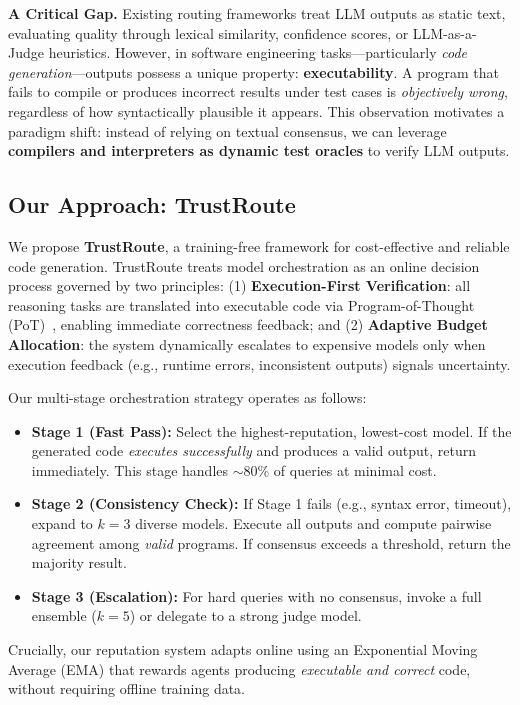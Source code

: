 \documentclass[acmsmall,screen,review,anonymous]{acmart}
\begin{document}
\textbf{A Critical Gap.} Existing routing frameworks treat LLM outputs as static text, evaluating quality through lexical similarity, confidence scores, or LLM-as-a-Judge heuristics. However, in software engineering tasks—particularly \textit{code generation}—outputs possess a unique property: \textbf{executability}. A program that fails to compile or produces incorrect results under test cases is \textit{objectively wrong}, regardless of how syntactically plausible it appears. This observation motivates a paradigm shift: instead of relying on textual consensus, we can leverage \textbf{compilers and interpreters as dynamic test oracles} to verify LLM outputs.

\subsection{Our Approach: TrustRoute}
We propose \textbf{TrustRoute}, a training-free framework for cost-effective and reliable code generation. TrustRoute treats model orchestration as an online decision process governed by two principles: (1) \textbf{Execution-First Verification}: all reasoning tasks are translated into executable code via Program-of-Thought (PoT)~\cite{gao2022pal}, enabling immediate correctness feedback; and (2) \textbf{Adaptive Budget Allocation}: the system dynamically escalates to expensive models only when execution feedback (e.g., runtime errors, inconsistent outputs) signals uncertainty.

Our multi-stage orchestration strategy operates as follows:
\begin{itemize}
    \item \textbf{Stage 1 (Fast Pass):} Select the highest-reputation, lowest-cost model. If the generated code \textit{executes successfully} and produces a valid output, return immediately. This stage handles $\sim$80\% of queries at minimal cost.
    \item \textbf{Stage 2 (Consistency Check):} If Stage 1 fails (e.g., syntax error, timeout), expand to $k=3$ diverse models. Execute all outputs and compute pairwise agreement among \textit{valid} programs. If consensus exceeds a threshold, return the majority result.
    \item \textbf{Stage 3 (Escalation):} For hard queries with no consensus, invoke a full ensemble ($k=5$) or delegate to a strong judge model.
\end{itemize}

Crucially, our reputation system adapts online using an Exponential Moving Average (EMA) that rewards agents producing \textit{executable and correct} code, without requiring offline training data.
\end{document}
